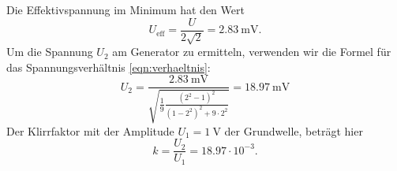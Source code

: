 Die Effektivspannung im Minimum hat den Wert
\begin{equation*}
  U_\text{eff} = \frac{U}{2 \sqrt{2}} = \SI{2.83}{\milli \volt}.
\end{equation*}
Um die Spannung $U_2$ am Generator zu ermitteln, verwenden wir die Formel für das Spannungsverhältnis \eqref{eqn:verhaeltnis}:
\begin{equation*}
  U_2 = \frac{\SI{2.83}{\milli\volt}}{\sqrt{\frac{1}{9} \frac{(2^2-1)^2}{(1-2^2)^2+9\cdot 2^2}}} = \SI{18.97}{\milli \volt}
\end{equation*}
Der Klirrfaktor mit der Amplitude $U_1=\SI{1}{\volt}$ der Grundwelle, beträgt hier
\begin{equation*}
  k = \frac{U_2}{U_1} = 18.97 \cdot 10^{-3}.
\end{equation*}